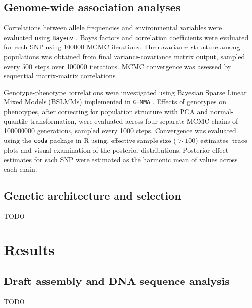 \documentclass[smallextended]{svjour3}
\begin{document}
\subsection*{Genome-wide association analyses}

Correlations between allele frequencies and environmental variables were
evaluated using \texttt{Bayenv} \citep[][version
2.0]{Gunther:2013ik,COOP:2010ke}. Bayes factors and correlation coefficients
were evaluated for each SNP using \num{100000} MCMC iterations.  The covariance
structure among populations was obtained from final variance-covariance matrix
output, sampled every 500 steps over \num{100000} iterations.  MCMC convergence
was assessed by sequential matrix-matrix correlations.

Genotype-phenotype correlations were investigated using Bayesian Sparse Linear
Mixed
Models (BSLMMs) implemented in \texttt{GEMMA} \citep[][version
0.94.1]{Zhou:2013fh}.  Effects of  genotypes on phenotypes, after correcting
for
population structure with PCA and normal-quantile transformation, were
evaluated
across four separate MCMC chains of \num{100000000} generations, sampled  every
1000 steps.  Convergence was evaluated using the \texttt{coda} package in R
\citep[][version 0.18.1]{coda} using, effective sample size ($> 100$)
estimates,
trace plots and visual examination of the posterior distributions. Posterior
effect estimates for each SNP were estimated as the harmonic mean of values
across each chain.


\subsection*{Genetic architecture and selection}
TODO

\section*{Results}

\subsection*{Draft assembly and DNA sequence analysis}
TODO
\end{document}
